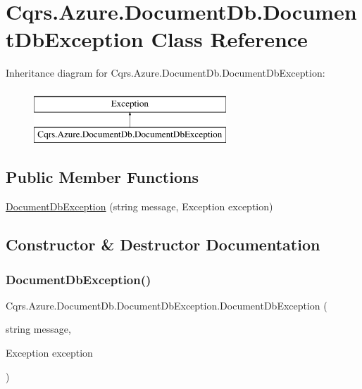 \hypertarget{classCqrs_1_1Azure_1_1DocumentDb_1_1DocumentDbException}{}\section{Cqrs.\+Azure.\+Document\+Db.\+Document\+Db\+Exception Class Reference}
\label{classCqrs_1_1Azure_1_1DocumentDb_1_1DocumentDbException}
Inheritance diagram for Cqrs.\+Azure.\+Document\+Db.\+Document\+Db\+Exception\+:\begin{figure}[H]
\begin{center}
\leavevmode
\includegraphics[height=2.000000cm]{classCqrs_1_1Azure_1_1DocumentDb_1_1DocumentDbException}
\end{center}
\end{figure}
\subsection*{Public Member Functions}
\begin{DoxyCompactItemize}
\item 
\hyperlink{classCqrs_1_1Azure_1_1DocumentDb_1_1DocumentDbException_a19e08be1e69ac87230e739e784f3c6b6_a19e08be1e69ac87230e739e784f3c6b6}{Document\+Db\+Exception} (string message, Exception exception)
\end{DoxyCompactItemize}


\subsection{Constructor \& Destructor Documentation}
\mbox{\label{classCqrs_1_1Azure_1_1DocumentDb_1_1DocumentDbException_a19e08be1e69ac87230e739e784f3c6b6_a19e08be1e69ac87230e739e784f3c6b6}} 
\subsubsection{\texorpdfstring{Document\+Db\+Exception()}{DocumentDbException()}}
{\footnotesize\ttfamily Cqrs.\+Azure.\+Document\+Db.\+Document\+Db\+Exception.\+Document\+Db\+Exception (\begin{DoxyParamCaption}\item[{string}]{message,  }\item[{Exception}]{exception }\end{DoxyParamCaption})}

